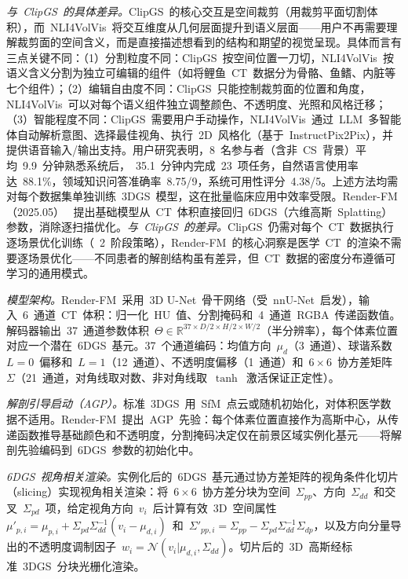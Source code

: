\textit{与~ClipGS~的具体差异。}ClipGS~的核心交互是空间裁剪（用裁剪平面切割体积），而~NLI4VolVis~将交互维度从几何层面提升到语义层面——用户不再需要理解裁剪面的空间含义，而是直接描述想看到的结构和期望的视觉呈现。具体而言有三点关键不同：（1）分割粒度不同：ClipGS~按空间位置一刀切，NLI4VolVis~按语义含义分割为独立可编辑的组件（如将鲤鱼~CT~数据分为骨骼、鱼鳍、内脏等七个组件）；（2）编辑自由度不同：ClipGS~只能控制裁剪面的位置和角度，NLI4VolVis~可以对每个语义组件独立调整颜色、不透明度、光照和风格迁移；（3）智能程度不同：ClipGS~需要用户手动操作，NLI4VolVis~通过~LLM~多智能体自动解析意图、选择最佳视角、执行~2D~风格化（基于~InstructPix2Pix），并提供语音输入/输出支持。用户研究表明，8~名参与者（含非~CS~背景）平均~9.9~分钟熟悉系统后，~35.1~分钟内完成~23~项任务，自然语言使用率达~88.1\%，领域知识问答准确率~8.75/9，系统可用性评分~4.38/5。上述方法均需对每个数据集单独训练~3DGS~模型，这在批量临床应用中效率受限。Render-FM（2025.05）~\cite{2505_17338} 提出基础模型从~CT~体积直接回归~6DGS（六维高斯~Splatting）参数，消除逐扫描优化。\textit{与~ClipGS~的差异。}ClipGS~仍需对每个~CT~数据执行逐场景优化训练（~2~阶段策略），Render-FM~的核心洞察是医学~CT~的渲染不需要逐场景优化——不同患者的解剖结构虽有差异，但~CT~数据的密度分布遵循可学习的通用模式。

\textit{模型架构。}Render-FM~采用~3D U-Net~骨干网络（受~nnU-Net~启发），输入~6~通道~CT~体积：归一化~HU~值、分割掩码和~4~通道~RGBA~传递函数值。解码器输出~37~通道参数体积~$\Theta \in \mathbb{R}^{37 \times D/2 \times H/2 \times W/2}$（半分辨率），每个体素位置对应一个潜在~6DGS~基元。37~个通道编码：均值方向~$\mu_d$（3~通道）、球谐系数~$L=0$~偏移和~$L=1$（12~通道）、不透明度偏移（1~通道）和~$6\times6$~协方差矩阵~$\Sigma$（21~通道，对角线取对数、非对角线取~$\tanh$~激活保证正定性）。

\textit{解剖引导启动（AGP）。}标准~3DGS~用~SfM~点云或随机初始化，对体积医学数据不适用。Render-FM~提出~AGP~先验：每个体素位置直接作为高斯中心，从传递函数推导基础颜色和不透明度，分割掩码决定仅在前景区域实例化基元——将解剖先验编码到~6DGS~参数的初始化中。

\textit{6DGS~视角相关渲染。}实例化后的~6DGS~基元通过协方差矩阵的视角条件化切片（slicing）实现视角相关渲染：将~$6\times6$~协方差分块为空间~$\Sigma_{pp}$、方向~$\Sigma_{dd}$~和交叉~$\Sigma_{pd}$~项，给定视角方向~$v_i$~后计算有效~3D~空间属性~$\mu'_{p,i} = \mu_{p,i} + \Sigma_{pd}\Sigma_{dd}^{-1}(v_i - \mu_{d,i})$~和~$\Sigma'_{pp,i} = \Sigma_{pp} - \Sigma_{pd}\Sigma_{dd}^{-1}\Sigma_{dp}$，以及方向分量导出的不透明度调制因子~$w_i = \mathcal{N}(v_i | \mu_{d,i}, \Sigma_{dd})$。切片后的~3D~高斯经标准~3DGS~分块光栅化渲染。

